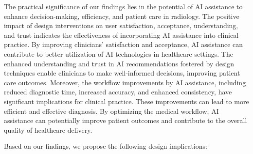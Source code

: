 The practical significance of our findings lies in the potential of \ac{AI} assistance to enhance decision-making, efficiency, and patient care in radiology.
The positive impact of design interventions on user satisfaction, acceptance, understanding, and trust indicates the effectiveness of incorporating \ac{AI} assistance into clinical practice.
By improving clinicians' satisfaction and acceptance, \ac{AI} assistance can contribute to better utilization of \ac{AI} technologies in healthcare settings.
The enhanced understanding and trust in \ac{AI} recommendations fostered by design techniques enable clinicians to make well-informed decisions, improving patient care outcomes.
Moreover, the workflow improvements by \ac{AI} assistance, including reduced diagnostic time, increased accuracy, and enhanced consistency, have significant implications for clinical practice.
These improvements can lead to more efficient and effective diagnosis.
By optimizing the medical workflow, \ac{AI} assistance can potentially improve patient outcomes and contribute to the overall quality of healthcare delivery.

\noindent
Based on our findings, we propose the following design implications:

\vspace{0.05mm}


